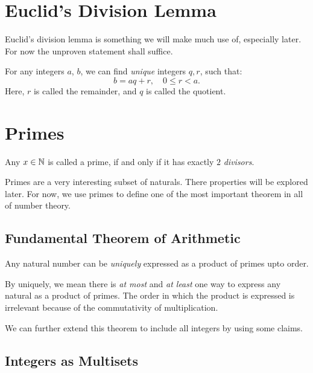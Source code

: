 \section{Euclid's Division Lemma}

Euclid's division lemma is something we will make much use of, especially later. For now the unproven statement shall suffice.

\begin{theorem}
    \label{thm: euclid}
    For any integers \(a\), \(b\), we can find \textit{unique} integers \(q, r\), such that: \[b=aq + r, \quad 0 \le r <a. \]
    Here, \(r\) is called the remainder, and \(q\) is called the quotient.
\end{theorem}

\section{Primes}


\begin{definition}
    [Primes]
    Any \(x \in \mathbb N\) is called a prime, if and only if it has exactly \(2\) \textit{divisors}.
\end{definition}

Primes are a very interesting subset of naturals. There properties will be explored later. For now, we use primes to define one of the most important theorem in all of number theory.

\subsection{Fundamental Theorem of Arithmetic}

\begin{theorem}
    \label{thm: fta}
    Any natural number can be \textit{uniquely} expressed as a product of primes upto order.
\end{theorem}

By uniquely, we mean there is \textit{at most} and \textit{at least} one way to express any natural as a product of primes. The order in which the product is expressed is irrelevant because of the commutativity of multiplication. \par 
We can further extend this theorem to include all integers by using some claims.

\subsection{Integers as Multisets}

